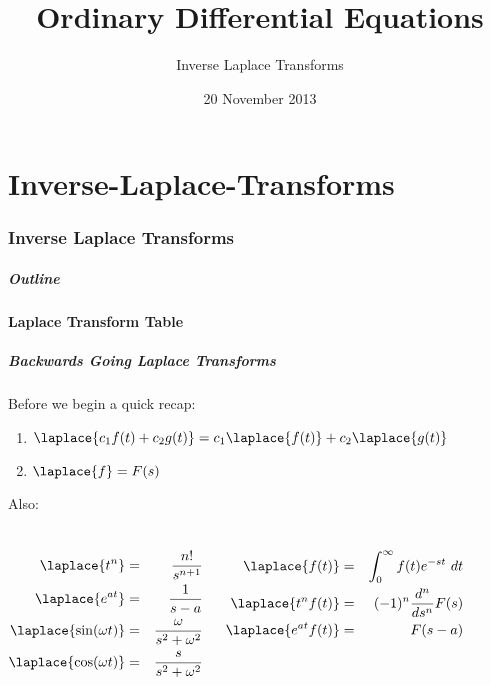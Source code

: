 \part{Inverse-Laplace-Transforms}
\section{Inverse Laplace Transforms}


\title{Ordinary Differential Equations}
\subtitle{Inverse Laplace Transforms}
\date{20 November 2013}

\begin{frame}
  \titlepage
\end{frame}

\begin{frame}
  \frametitle{Outline}
  \tableofcontents[ currentsection]
\end{frame}


\subsection{Laplace Transform Table}

\begin{frame}
  \frametitle{Backwards Going Laplace Transforms }

  Before we begin a quick recap:
  \begin{enumerate}
  \item $\laplace{c_1 f(t) + c_2 g(t)}=c_1 \laplace{f(t)} + c_2 \laplace{g(t)}$
  \item $\laplace{f}=F(s)$
  \end{enumerate}

  Also:
  \begin{columns}
    \begin{eqnarray*}
      \laplace{t^n}    & = & \frac{n!}{s^{n+1}} \\
      \laplace{e^{at}} & = & \frac{1}{s-a} \\
      \laplace{\sin(\omega t)} & = & \frac{\omega}{s^2+\omega^2} \\
      \laplace{\cos(\omega t)} & = & \frac{s}{s^2+\omega^2} \\
    \end{eqnarray*}

    \begin{eqnarray*}
      \laplace{f(t)}  & = & \int^\infty_0 f(t) e^{-st} ~ dt \\
      \laplace{t^nf(t)} & = & (-1)^n\frac{d^n}{ds^n}F(s) \\
      \laplace{e^{at}f(t)} & = & F(s-a)
    \end{eqnarray*}

  \end{columns}


\end{frame}

